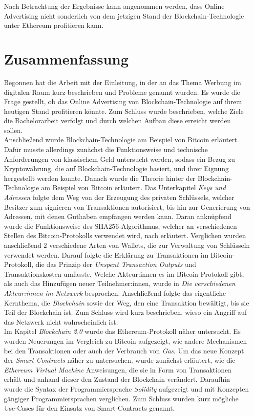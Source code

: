 Nach Betrachtung der Ergebnisse kann angenommen werden, dass Online Advertising nicht sonderlich von dem jetzigen Stand der Blockchain-Technologie unter Ethereum profitieren kann.
\section{Zusammenfassung}
Begonnen hat die Arbeit mit der Einleitung, in der an das Thema Werbung im digitalen Raum kurz beschrieben und Probleme genannt wurden. Es wurde die Frage gestellt, ob das Online Advertising von Blockchain-Technologie auf ihrem heutigen Stand profitieren könnte. Zum Schluss wurde beschrieben, welche Ziele die Bachelorarbeit verfolgt und durch welchen Aufbau diese erreicht werden sollen.\\
 
Anschließend wurde Blockchain-Technologie am Beispiel von Bitcoin erläutert. Dafür musste allerdings zunächst die Funktionsweise und technische Anforderungen von klassischem Geld untersucht werden, sodass ein Bezug zu Kryptowährung, die auf Blockchain-Technologie basiert, und ihrer Eignung hergestellt werden konnte. 
Danach wurde die Theorie hinter der Blockchain-Technologie am Beispiel von Bitcoin erläutert. 
Das Unterkapitel \emph{Keys und Adressen} folgte dem Weg von der Erzeugung des privaten Schlüssels, welcher Besitzer zum signieren von Transaktionen autorisiert, bis hin zur Generierung von Adressen, mit denen Guthaben empfangen werden kann. 
Daran anknüpfend wurde die Funktionsweise des SHA256-Algorithmus, welcher an verschiedenen Stellen des Bitcoin-Protokolls verwendet wird, nach \cite{dang_2015} erläutert. 
Verglichen wurden anschließend 2 verschiedene Arten von Wallets, die zur Verwaltung von Schlüsseln verwendet werden.
Darauf folgte die Erklärung zu Transaktionen im Bitcoin-Protokoll, die das Prinzip der \emph{Unspent Transaction Outputs} und Transaktionskosten umfasste.
Welche Akteur:innen es im Bitcoin-Protokoll gibt, als auch das Hinzufügen neuer Teilnehmer:innen, wurde in \emph{Die verschiedenen Akteur:innen im Netzwerk} besprochen.
Anschließend folgte das eigentliche Kernthema, die \emph{Blockchain} sowie der Weg, den eine Transaktion bewältigt, bis sie Teil der Blockchain ist. Zum Schluss wird kurz beschrieben, wieso ein Angriff auf das Netzwerk nicht wahrscheinlich ist.\\

Im Kapitel \emph{Blockchain 2.0} wurde das Ethereum-Protokoll näher untersucht. Es wurden Neuerungen im Vergleich zu Bitcoin aufgezeigt, wie andere Mechanismen bei den Transaktionen oder auch der Verbrauch von \emph{Gas}.
Um das neue Konzept der \emph{Smart-Contracts} näher zu untersuchen, wurde zunächst erläutert, wie die \emph{Ethereum Virtual Machine} Anweisungen, die sie in Form von Transaktionen erhält und anhand dieser den Zustand der Blockchain verändert. Daraufhin wurde die Syntax der Programmiersprache \emph{Solidity} aufgezeigt und mit Konzepten gängiger Programmiersprachen verglichen.
Zum Schluss wurden kurz mögliche Use-Cases für den Einsatz von Smart-Contracts genannt.\\

